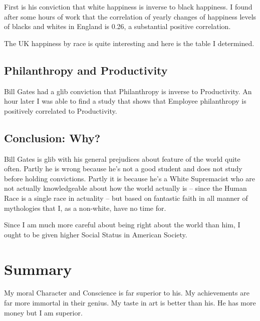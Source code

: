 \documentclass{amsart}
\begin{document}
First is his conviction that white happiness is inverse to black happiness.  I found after some hours of work that the correlation of yearly changes of happiness levels of blacks and whites in England is 0.26, a substantial positive correlation.  

The UK happiness by race is quite interesting and here is the table I determined.


\subsection{Philanthropy and Productivity}

Bill Gates had a glib conviction that Philanthropy is inverse to Productivity.  An hour later I was able to find a study that shows that Employee philanthropy is positively correlated to Productivity.

\subsection{Conclusion: Why?}
Bill Gates is glib with his general prejudices about feature of the world quite often.  Partly he is wrong because he's not a good student and does not study before holding convictions.  Partly it is because he's a White Supremacist who are not actually knowledgeable about how the world actually is -- since the Human Race is a single race in actuality -- but based on fantastic faith in all manner of mythologies that I, as a non-white, have no time for.  

Since I am much more careful about being right about the world than him, I ought to be given higher Social Status in American Society.


\section{Summary}
My moral Character and Conscience is far superior to his.  My achievements are far more immortal in their genius.  My taste in art is better than his.  He has more money but I am superior.
\end{document}
